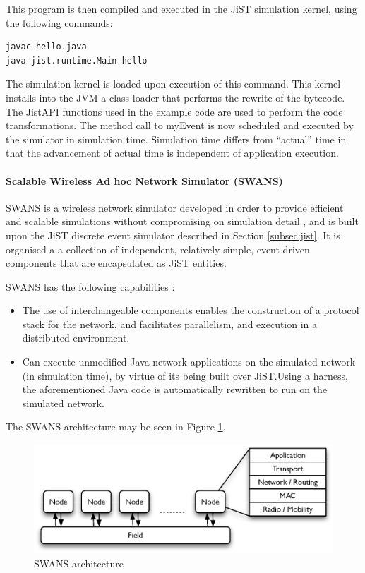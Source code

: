This program is then compiled and executed in the JiST simulation
kernel, using the following commands:

  
\begin{lstlisting}[frame=trbl, basewidth={0.55em, 0.6em}, captionpos=b, 
basicstyle=\ttfamily\footnotesize, breaklines, caption = Execution of the
program in the JiST, label = listing:JiST ]  
javac hello.java
java jist.runtime.Main hello
\end{lstlisting}


The simulation kernel is loaded upon execution of this command. This kernel
installs into the JVM a class loader that performs the rewrite of the bytecode.
The JistAPI functions used in the example code are used to perform the
code transformations. The method call to myEvent is now scheduled and executed
by the simulator in simulation time. Simulation time differs from ``actual''
time in that the advancement of actual time is independent of application
execution. 
 
\paragraph{Scalable Wireless Ad hoc Network Simulator (SWANS)}
SWANS is a wireless network simulator developed in order to provide efficient
and scalable simulations without compromising on simulation detail \cite{barr_SWANS},
and is built upon the JiST discrete event simulator described in Section \ref{subsec:jist}. 
It is organised a a collection of independent, relatively simple, event driven
components that are encapsulated as JiST entities. 
  
SWANS has the following capabilities \cite{barr_SWANS}:

\begin{itemize}
\item The use of
interchangeable components enables the construction of a protocol stack for the
network, and facilitates parallelism, and execution in a distributed environment.
\item Can execute unmodified Java network applications on the
simulated network (in simulation time), by virtue of its being built over
JiST.Using a harness, the aforementioned Java code is automatically rewritten to
run on the simulated network.  
\end{itemize}
   
The SWANS architecture may be seen in Figure \ref{Fig:SWANS_architecture}. 

\begin{figure}[ht]
\centering
\includegraphics[width=\textwidth]{img/SWANS_architecture.eps} 
\caption[SWANS architecture]{SWANS architecture}
\label{Fig:SWANS_architecture}
\end{figure} 

